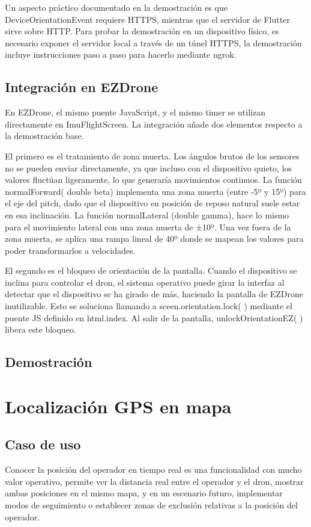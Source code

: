Un aspecto práctico documentado en la demostración es que DeviceOrientationEvent requiere HTTPS, mientras que el servidor de Flutter sirve sobre HTTP. Para probar la demostración en un dispositivo físico, es necesario exponer el servidor local a través de un túnel HTTPS, la demostración incluye instrucciones paso a paso para hacerlo mediante ngrok.

\subsection{Integración en EZDrone}
En EZDrone, el mismo puente JavaScript, y el mismo timer se utilizan directamente en ImuFlightScreen. La integración añade dos elementos respecto a la demostración base.

El primero es el tratamiento de zona muerta.  Los ángulos brutos de los sensores no se pueden enviar directamente, ya que incluso con el dispositivo quieto, los valores fluctúan ligeramente, lo que generaría movimientos continuos. La función normalForward( double beta) implementa una zona muerta (entre -5º y 15º) para el eje del pitch, dado que el dispositivo en posición de reposo natural suele estar en esa inclinación. 
La función normalLateral (double gamma), hace lo mismo para el movimiento lateral con una zona muerta de ±10º. Una vez fuera de la zona muerta, se aplica una rampa lineal de 40º donde se mapean los valores para poder transformarlos a velocidades.

El segundo es el bloqueo de orientación de la pantalla. Cuando el dispositivo se inclina para controlar el dron, el sistema operativo puede girar la interfaz al detectar que el dispositivo se ha girado de más, haciendo la pantalla de EZDrone inutilizable. Esto se soluciona llamando a sceen.orientation.lock( ) mediante el puente JS definido en html.index. Al salir de la pantalla, unlockOrientationEZ( ) libera este bloqueo.

\subsection{Demostración}

\section{Localización GPS en mapa}

\subsection{Caso de uso}
Conocer la posición del operador en tiempo real es una funcionalidad con mucho valor operativo, permite ver la distancia real entre el operador y el dron, mostrar ambas posiciones en el mismo mapa, y en un escenario futuro, implementar modos de seguimiento o establecer zonas de exclusión relativas a la posición del operador. 

